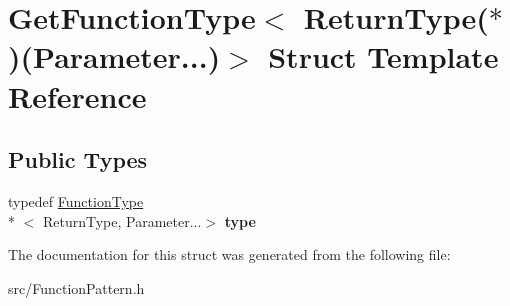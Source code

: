 \hypertarget{struct_get_function_type_3_01_return_type_07_5_08_07_parameter_8_8_8_08_4}{\section{Get\-Function\-Type$<$ Return\-Type($\ast$)(Parameter...)$>$ Struct Template Reference}
\label{struct_get_function_type_3_01_return_type_07_5_08_07_parameter_8_8_8_08_4}
}
\subsection*{Public Types}
\begin{DoxyCompactItemize}
\item 
\hypertarget{struct_get_function_type_3_01_return_type_07_5_08_07_parameter_8_8_8_08_4_a2579637e6f4b325bfebd2c1c3017dcb0}{typedef \hyperlink{struct_function_type}{Function\-Type}\\*
$<$ Return\-Type, Parameter...$>$ {\bfseries type}}\label{struct_get_function_type_3_01_return_type_07_5_08_07_parameter_8_8_8_08_4_a2579637e6f4b325bfebd2c1c3017dcb0}

\end{DoxyCompactItemize}


The documentation for this struct was generated from the following file\-:\begin{DoxyCompactItemize}
\item 
src/Function\-Pattern.\-h\end{DoxyCompactItemize}
